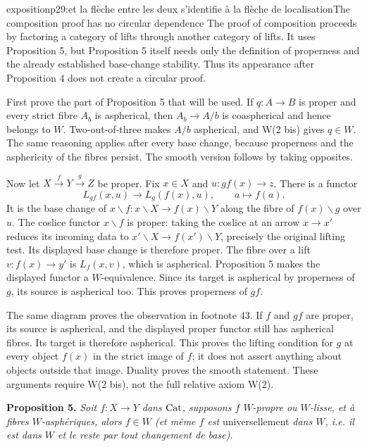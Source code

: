 \begin{dcomment}{exposition}{p29:et la flèche entre les deux s'identifie à la flèche de localisation}{The composition proof has no circular dependence}
The proof of composition proceeds by factoring a category of lifts through another category of lifts. It uses Proposition 5, but Proposition 5 itself needs only the definition of properness and the already established base-change stability. Thus its appearance after Proposition 4 does not create a circular proof.

First prove the part of Proposition 5 that will be used. If $q:A\to B$ is proper and every strict fibre $A_b$ is aspherical, then $A_b\to A/b$ is coaspherical and hence belongs to $W$. Two-out-of-three makes $A/b$ aspherical, and W(2 bis) gives $q\in W$. The same reasoning applies after every base change, because properness and the asphericity of the fibres persist. The smooth version follows by taking opposites.

Now let $X\xrightarrow fY\xrightarrow gZ$ be proper. Fix $x\in X$ and $u:gf(x)\to z$. There is a functor
\[
 L_{gf}(x,u)\longrightarrow L_g(f(x),u),\qquad a\longmapsto f(a).
\]
It is the base change of $x\backslash f:x\backslash X\to f(x)\backslash Y$ along the fibre of $f(x)\backslash g$ over $u$. The coslice functor $x\backslash f$ is proper: taking the coslice at an arrow $x\to x'$ reduces its incoming data to $x'\backslash X\to f(x')\backslash Y$, precisely the original lifting test. Its displayed base change is therefore proper. The fibre over a lift $v:f(x)\to y'$ is $L_f(x,v)$, which is aspherical. Proposition 5 makes the displayed functor a $W$-equivalence. Since its target is aspherical by properness of $g$, its source is aspherical too. This proves properness of $gf$.

The same diagram proves the observation in footnote 43. If $f$ and $gf$ are proper, its source is aspherical, and the displayed proper functor still has aspherical fibres. Its target is therefore aspherical. This proves the lifting condition for $g$ at every object $f(x)$ in the strict image of $f$; it does not assert anything about objects outside that image. Duality proves the smooth statement. These arguments require W(2 bis), not the full relative axiom W(2).
\end{dcomment}


\textbf{Proposition 5.} \textit{Soit $f : X\longrightarrow Y$ dans $\mathrm{Cat}$, supposons $f$ $W$-propre ou $W$-lisse, et à fibres $W$-asphériques, alors $f\in W$ (et même $f$ est} \textup{universellement} \textit{dans $W$, i.e. il est dans $W$ et le reste par tout changement de base).}

